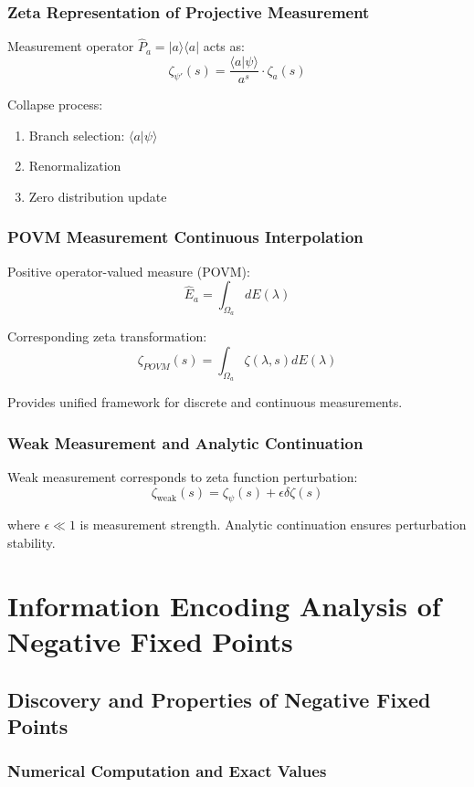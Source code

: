 \documentclass[11pt]{article}
\theoremstyle{plain}
\theoremstyle{definition}
\theoremstyle{remark}
\begin{document}
\subsubsection{Zeta Representation of Projective Measurement}

Measurement operator $\hat{P}_a = |a\rangle\langle a|$ acts as:
$$\zeta_{\psi'}(s) = \frac{\langle a | \psi \rangle}{a^s} \cdot \zeta_a(s)$$

Collapse process:
\begin{enumerate}
\item Branch selection: $\langle a | \psi \rangle$
\item Renormalization
\item Zero distribution update
\end{enumerate}

\subsubsection{POVM Measurement Continuous Interpolation}

Positive operator-valued measure (POVM):
$$\hat{E}_a = \int_{\Omega_a} dE(\lambda)$$

Corresponding zeta transformation:
$$\zeta_{POVM}(s) = \int_{\Omega_a} \zeta(\lambda, s) dE(\lambda)$$

Provides unified framework for discrete and continuous measurements.

\subsubsection{Weak Measurement and Analytic Continuation}

Weak measurement corresponds to zeta function perturbation:
$$\zeta_{\text{weak}}(s) = \zeta_{\psi}(s) + \epsilon \delta\zeta(s)$$

where $\epsilon \ll 1$ is measurement strength. Analytic continuation ensures perturbation stability.

\section{Information Encoding Analysis of Negative Fixed Points}

\subsection{Discovery and Properties of Negative Fixed Points}

\subsubsection{Numerical Computation and Exact Values}
\end{document}
